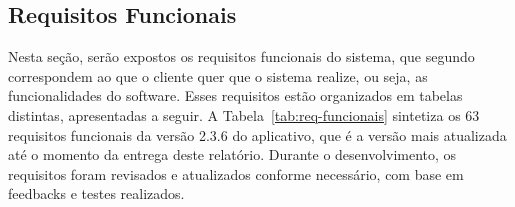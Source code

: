 \subsection{Requisitos Funcionais}

Nesta seção, serão expostos os requisitos funcionais do sistema, que segundo 
 correspondem ao que o cliente quer que o sistema realize,
ou seja, as funcionalidades do software. Esses requisitos estão organizados em tabelas
distintas, apresentadas a seguir. A Tabela~\ref{tab:req-funcionais} sintetiza os 63 requisitos funcionais
da versão 2.3.6 do aplicativo, que é a versão mais atualizada até o momento da entrega deste relatório.
Durante o desenvolvimento, os requisitos foram revisados e atualizados conforme necessário,
com base em feedbacks e testes realizados.

